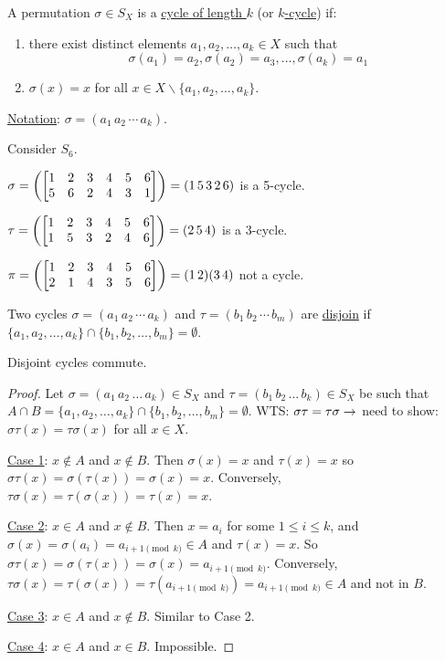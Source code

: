 \documentclass[]{article}
\begin{document}
\begin{definition}
	A permutation $\sigma\in S_X$ is a \ul{cycle of length $k$} (or \ul{$k$-cycle}) if:
	\begin{enumerate}
		\item there exist distinct elements $a_1,a_2,\dots,a_k\in X$ such that 
			$$\sigma(a_1) = a_2, \sigma(a_2) = a_3,\dots,\sigma(a_k) = a_1$$
		\item $\sigma(x) = x$ for all $x\in X\backslash\{a_1,a_2,\dots,a_k\}$.
	\end{enumerate}
	\ul{Notation}: $\sigma = (a_1\,a_2\,\cdots\,a_k)$.
\end{definition}
\begin{example}
	Consider $S_6$.

	$\sigma = \left(\begin{bmatrix}1&2&3&4&5&6\\5&6&2&4&3&1\end{bmatrix}\right) = (1\,5\,3\,2\,6)$ is a 5-cycle. 
	
	$\tau = \left(\begin{bmatrix}1&2&3&4&5&6\\1&5&3&2&4&6\end{bmatrix}\right) = (2\,5\,4)$ is a 3-cycle.

	$\pi = \left(\begin{bmatrix}1&2&3&4&5&6\\2&1&4&3&5&6\end{bmatrix}\right) = (1\,2)(3\,4)$ not a cycle.
\end{example}

\begin{definition}
	Two cycles $\sigma = (a_1\, a_2\,\cdots\, a_k)$ and $\tau = (b_1\,b_2\,\cdots\,b_m)$ are \ul{disjoin} if $\{a_1,a_2,\dots,a_k\}\cap \{b_1,b_2,\dots,b_m\} = \emptyset$.
\end{definition}

\begin{proposition}
	Disjoint cycles commute.
\end{proposition}
\begin{proof}
	Let $\sigma = (a_1\,a_2\,\dots\,a_k)\in S_X$ and $\tau = (b_1\,b_2\,\dots\,b_k)\in S_X$ be such that $A\cap B = \{a_1,a_2,\dots,a_k\}\cap \{b_1,b_2,\dots,b_m\} = \emptyset$.
	WTS: $\sigma\tau = \tau\sigma \rightarrow$ need to show: $\sigma\tau(x) = \tau\sigma(x)$ for all $x\in X$.

	\ul{Case 1}: $x\notin A$ and $x\notin B$. Then $\sigma(x) = x$ and $\tau(x) = x$ so $\sigma\tau(x) = \sigma(\tau(x)) = \sigma(x) = x$. Conversely, $\tau\sigma(x) = \tau(\sigma(x)) = \tau(x) = x$.

	\ul{Case 2}: $x\in A$ and $x\notin B$. Then $x = a_i$ for some $1\leq i\leq k$, and $\sigma(x) = \sigma(a_i) = a_{i+1\pmod k}\in A$ and $\tau(x) = x$. So $\sigma\tau(x) = \sigma(\tau(x)) = \sigma(x) = a_{i+1\pmod k}$. Conversely, $\tau\sigma(x) = \tau(\sigma(x)) = \tau(a_{i+1\pmod k}) = a_{i+1\pmod k}\in A$ and not in $B$.

	\ul{Case 3}: $x\in A$ and $x\notin B$. Similar to Case 2.

	\ul{Case 4}: $x\in A$ and $x\in B$. Impossible.
\end{proof}
\end{document}
